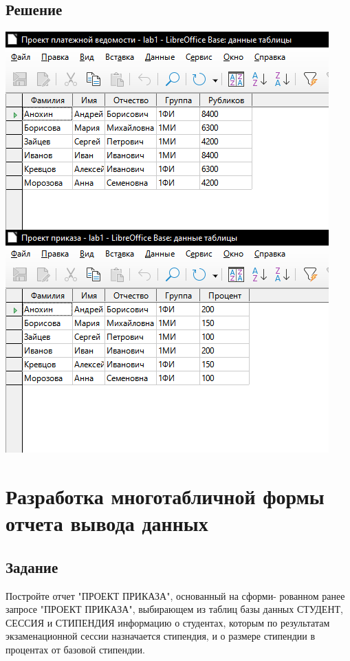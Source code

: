 \documentclass[a4paper, 12pt]{article}
\begin{document}
\subsection{Решение}
\includegraphics[width=\textwidth]{"10-1.png"}\\

\section{Разработка многотабличной формы отчета вывода 
данных }
\subsection{Задание}
Постройте  отчет  "ПРОЕКТ  ПРИКАЗА",  основанный  на  сформи-
рованном  ранее запросе  "ПРОЕКТ ПРИКАЗА",  выбирающем  из  таблиц 
базы данных СТУДЕНТ, СЕССИЯ и СТИПЕНДИЯ информацию о студентах, 
которым  по  результатам  экзаменационной  сессии  назначается 
стипендия, и о размере стипендии в процентах от базовой стипендии. 
\end{document}
